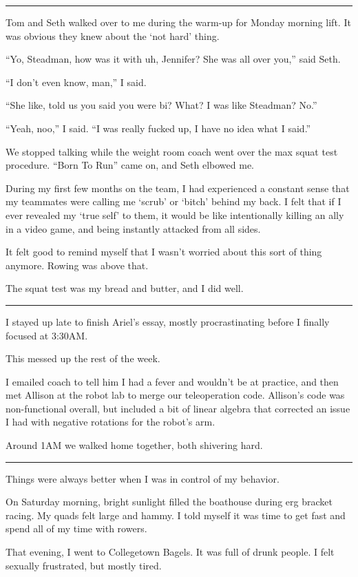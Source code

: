 \plainfancybreak{12pt}{2}{}

Tom and Seth walked over to me during the warm-up for Monday morning lift.  It
was obvious they knew about the `not hard' thing.

``Yo, Steadman, how was it with uh, Jennifer?  She was all over you,'' said
Seth.

``I don't even know, man,'' I said.

``She like, told us you said you were bi?  What?  I was like Steadman?
No.''

``Yeah, noo,'' I said. ``I was really fucked up, I have no idea what I said.''

We stopped talking while the weight room coach went over the max squat test
procedure.  ``Born To Run'' came on, and Seth elbowed me.

During my first few months on the team, I had experienced a constant sense that
my teammates were calling me `scrub' or `bitch' behind my back.  I felt that if
I ever revealed my `true self' to them, it would be like intentionally killing
an ally in a video game, and being instantly attacked from all sides.

It felt good to remind myself that I wasn't worried about this sort of thing
anymore.  Rowing was above that.

The squat test was my bread and butter, and I did well.

\plainfancybreak{12pt}{2}{}

I stayed up late to finish Ariel's essay, mostly procrastinating before I
finally focused at 3:30AM.

This messed up the rest of the week.

I emailed coach to tell him I had a fever and wouldn't be at practice, and then
met Allison at the robot lab to merge our teleoperation code.   Allison's code
was non-functional overall, but included a bit of linear algebra that corrected
an issue I had with negative rotations for the robot's arm.

Around 1AM we walked home together, both shivering hard.

\plainfancybreak{12pt}{2}{}

Things were always better when I was in control of my behavior.

On Saturday morning, bright sunlight filled the boathouse during erg bracket
racing.  My quads felt large and hammy.  I told myself it was time to get fast
and spend all of my time with rowers.

That evening, I went to Collegetown Bagels.  It was full of drunk people.  I
felt sexually frustrated, but mostly tired.

